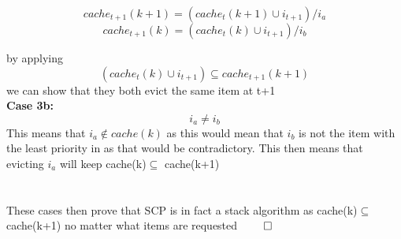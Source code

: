 \begin{lemma}
\[cache_{t+1}(k+1) =  (cache_{t}(k+1)\cup i_{t+1}) / i_a \]
\[cache_{t+1}(k) =  (cache_{t}(k)\cup i_{t+1}) / i_b \]

by applying  
\[(cache_{t}(k) \cup i_{t+1}) \subseteq cache_{t+1}(k+1)\]
 we can show that they both evict the same item at t+1 \\

 \textbf{Case 3b:}
\[i_a \neq i_b\]
This means that $i_a \notin cache(k)$ as this would mean that $i_b$ is not the item with the least priority in as that would be contradictory. This then means that evicting $i_a$ will keep cache(k)$\subseteq$ cache(k+1) \\ \\ \\

These cases then prove that SCP is in fact a stack algorithm as cache(k)$\subseteq$ cache(k+1) no matter what items are requested $\qed$
\end{lemma}